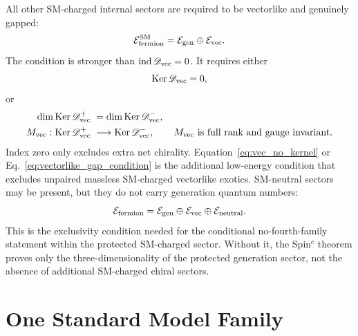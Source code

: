 \documentclass[aps,prd,preprint,notitlepage,nofootinbib,superscriptaddress,floatfix]{revtex4-2}
\newcommand{\Ker}{\operatorname{Ker}}
\newcommand{\cE}{\mathcal E}
\newcommand{\scrD}{\mathscr D}
\theoremstyle{remark}
\begin{document}
All other SM-charged internal sectors are required to be vectorlike and genuinely gapped:
\begin{equation}
\cE_{\rm fermion}^{\rm SM}
=
\cE_{\rm gen}
\oplus
\cE_{\rm vec}.
\label{eq:exclusivity_vec}
\end{equation}
The condition is stronger than \(\operatorname{ind}\scrD_{\rm vec}=0\).
It requires either
\begin{equation}
\Ker\scrD_{\rm vec}=0,
\label{eq:vec_no_kernel}
\end{equation}
or
\begin{equation}
\begin{aligned}
\dim\Ker\scrD_{\rm vec}^+
\;&=
\dim\Ker\scrD_{\rm vec}^-,
\\
M_{\rm vec}:\Ker\scrD_{\rm vec}^+
\;&\longrightarrow
\Ker\scrD_{\rm vec}^-,
\qquad
M_{\rm vec}\text{ is full rank and gauge invariant}.
\end{aligned}
\label{eq:vectorlike_gap_condition}
\end{equation}
Index zero only excludes extra net chirality.
Equation~\eqref{eq:vec_no_kernel} or Eq.~\eqref{eq:vectorlike_gap_condition} is the additional low-energy condition that excludes unpaired massless SM-charged vectorlike exotics.
SM-neutral sectors may be present, but they do not carry generation quantum numbers:
\begin{equation}
\cE_{\rm fermion}
=
\cE_{\rm gen}
\oplus
\cE_{\rm vec}
\oplus
\cE_{\rm neutral}.
\label{eq:fermion_sector_decomp}
\end{equation}
This is the exclusivity condition needed for the conditional no-fourth-family statement within the protected SM-charged sector.
Without it, the Spin\(^c\) theorem proves only the three-dimensionality of the protected generation sector, not the absence of additional SM-charged chiral sectors.

\section{One Standard Model Family}
\label{sec:one_family}
\end{document}
